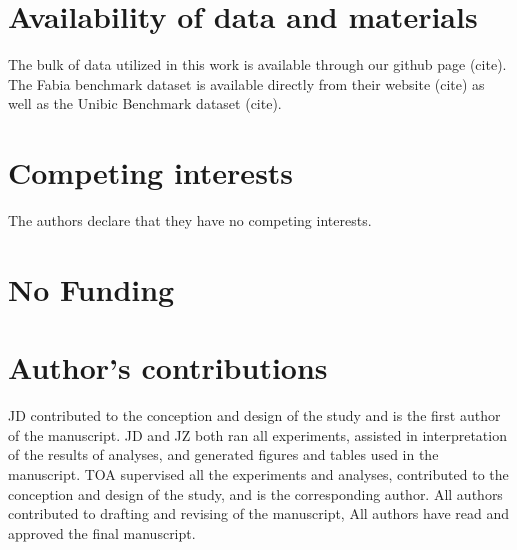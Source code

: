 \documentclass{bmcart}
\begin{document}
\begin{backmatter}

\section*{Availability of data and materials}
The bulk of data utilized in this work is available through our github page (cite). The Fabia benchmark dataset is available directly from their website (cite) as well as the Unibic Benchmark dataset (cite).  

\section*{Competing interests}
  The authors declare that they have no competing interests.

\section*{No Funding}

\section*{Author's contributions}
   JD contributed to
the conception and design of the study and is the first author of the
manuscript. JD and JZ both ran all experiments, assisted in interpretation of the results of analyses, and generated figures and tables used in the manuscript.
TOA supervised all the experiments and analyses, contributed to the conception and design of the study, and is the corresponding author. All authors contributed to drafting and revising of the manuscript, All authors have read and approved the
final manuscript.



\end{backmatter}
\end{document}
